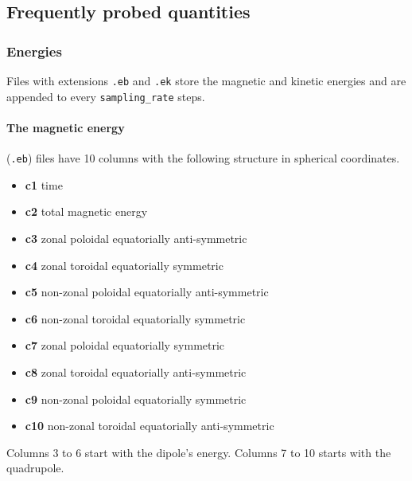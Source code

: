 \documentclass[a4paper,10pt]{book}
\begin{document}
\subsection{Frequently probed quantities}
\subsubsection{Energies}
Files with extensions \verb|.eb| and \verb|.ek| store the magnetic and kinetic
energies and are appended to every \verb|sampling_rate| steps.
\paragraph{The magnetic energy} (\verb|.eb|) files have 10 columns with the
following structure in spherical coordinates.
\begin{itemize}
 \item{\bf c1} time
 \item{\bf c2} total magnetic energy
 \item{\bf c3} zonal poloidal equatorially anti-symmetric
 \item{\bf c4} zonal toroidal equatorially symmetric
 \item{\bf c5} non-zonal poloidal equatorially anti-symmetric
 \item{\bf c6} non-zonal toroidal equatorially symmetric
 \item{\bf c7} zonal poloidal equatorially symmetric
 \item{\bf c8} zonal toroidal equatorially anti-symmetric
 \item{\bf c9} non-zonal poloidal equatorially symmetric
 \item{\bf c10} non-zonal toroidal equatorially anti-symmetric
\end{itemize}
Columns 3 to 6 start with the dipole's energy. Columns 7 to 10 starts with the
quadrupole.
\end{document}

